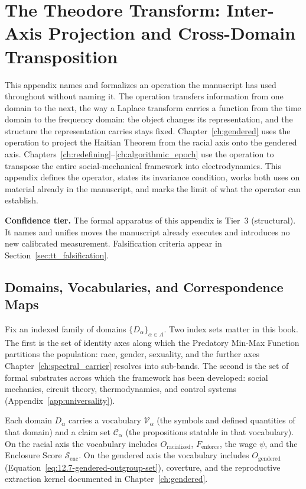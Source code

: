 \chapter{The Theodore Transform: Inter-Axis Projection and Cross-Domain Transposition}
\label{apx:theodore_transform}

This appendix names and formalizes an operation the manuscript has used throughout without naming
it. The operation transfers information from one domain to the next, the way a Laplace transform
carries a function from the time domain to the frequency domain: the object changes its
representation, and the structure the representation carries stays fixed. Chapter~\ref{ch:gendered}
uses the operation to project the Haitian Theorem from the racial axis onto the gendered axis.
Chapters~\ref{ch:redefining}--\ref{ch:algorithmic_epoch} use the operation to transpose the entire
social-mechanical framework into electrodynamics. This appendix defines the operator, states its
invariance condition, works both uses on material already in the manuscript, and marks the limit of
what the operator can establish.

\medskip

\noindent\textbf{Confidence tier.} The formal apparatus of this appendix is Tier~3 (structural).
It names and unifies moves the manuscript already executes and introduces no new calibrated
measurement. Falsification criteria appear in Section~\ref{sec:tt_falsification}.

\section{Domains, Vocabularies, and Correspondence Maps}
\label{sec:tt_domains}

Fix an indexed family of domains $\{D_\alpha\}_{\alpha \in A}$. Two index sets matter in this book.
The first is the set of identity axes along which the Predatory Min-Max Function partitions the
population: race, gender, sexuality, and the further axes Chapter~\ref{ch:spectral_carrier}
resolves into sub-bands. The second is the set of formal substrates across which the framework has
been developed: social mechanics, circuit theory, thermodynamics, and control systems
(Appendix~\ref{app:universality}).

Each domain $D_\alpha$ carries a vocabulary $\mathcal{V}_\alpha$ (the symbols and defined
quantities of that domain) and a claim set $\mathcal{C}_\alpha$ (the propositions statable in that
vocabulary). On the racial axis the vocabulary includes $O_{\text{racialized}}$,
$F_{\text{enforce}}$, the wage $\psi$, and the Enclosure Score $\mathcal{S}_{\text{enc}}$. On the
gendered axis the vocabulary includes $O_{\text{gendered}}$
(Equation~\ref{eq:12.7-gendered-outgroup-set}), coverture, and the reproductive extraction kernel
documented in Chapter~\ref{ch:gendered}.

